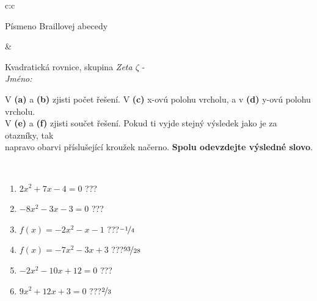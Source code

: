 \documentclass[10pt]{report}
\begin{document}
\begin{tabular}{c:c}
\begin{minipage}[c][104.5mm][t]{0.5\linewidth}
\begin{center}
\begin{minipage}{0.20\linewidth}
\begin{center}
{\small Písmeno Braillovej abecedy}
\end{center}
\end{minipage}
\end{center}
\end{minipage}
&
\begin{minipage}[c][104.5mm][t]{0.5\linewidth}
\begin{center}
\vspace{7mm}
{\huge Kvadratická rovnice, skupina \textit{Zeta $\zeta$} -}\\[5mm]
\textit{Jméno:}\phantom{xxxxxxxxxxxxxxxxxxxxxxxxxxxxxxxxxxxxxxxxxxxxxxxxxxxxxxxxxxxxxxxxx}\\[5mm]
\begin{minipage}{0.95\linewidth}
\begin{center}
V \textbf{(a)} a \textbf{(b)} zjisti počet řešení. V \textbf{(c)} x-ovú polohu vrcholu, a v \textbf{(d)} y-ovú polohu vrcholu.\\V \textbf{(e)} a \textbf{(f)} zjisti součet řešení. Pokud ti vyjde stejný výsledek jako je za otazníky, tak\\napravo obarvi příslušející kroužek načerno. \textbf{Spolu odevzdejte výsledné slovo}.
\end{center}
\end{minipage}
\\[1mm]
\begin{minipage}{0.79\linewidth}
\begin{center}
\begin{varwidth}{\linewidth}
\begin{enumerate}
\Large
\item $2x^2+7x-4=0$\quad \dotfill\; ???\;\dotfill {}
\item $-8x^2-3x-3=0$\quad \dotfill\; ???\;\dotfill {}
\item $f(x)=-2x^2-x-1$\quad \dotfill\; ???\;\dotfill \quad $\nicefrac{-1}{4}$
\item $f(x)=-7x^2-3x+3$\quad \dotfill\; ???\;\dotfill \quad $\nicefrac{93}{28}$
\item $-2x^2-10x+12=0$\quad \dotfill\; ???\;\dotfill {}
\item $9x^2+12x+3=0$\quad \dotfill\; ???\;\dotfill \quad $\nicefrac{2}{3}$
\end{enumerate}
\end{varwidth}
\end{center}
\end{minipage}
\begin{minipage}{0.20\linewidth}

\end{minipage}
\end{center}
\end{minipage}
\end{tabular}
\end{document}
